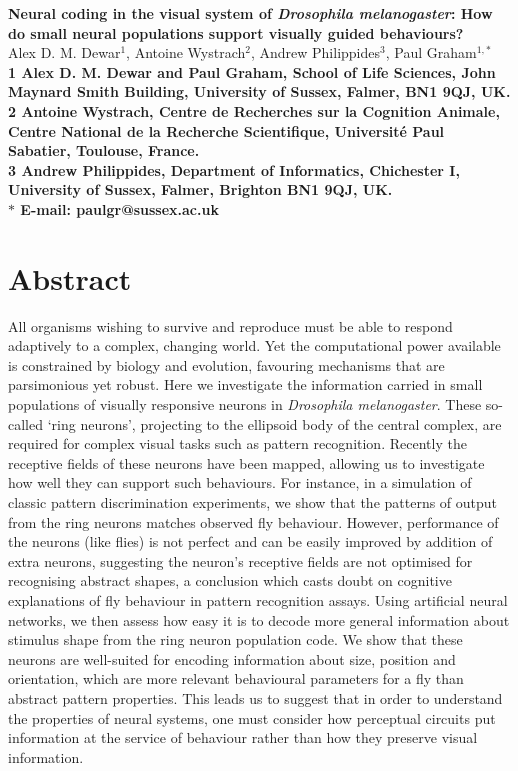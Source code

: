 \documentclass[10pt]{article}
\date{}
\begin{document}
\begin{flushleft}
{\Large
\textbf{Neural coding in the visual system of \emph{Drosophila melanogaster}: How do small neural populations support visually guided behaviours?}
}
\\
Alex D. M. Dewar$^{1}$,
Antoine Wystrach$^{2}$,
Andrew Philippides$^{3}$,
Paul Graham$^{1,\ast}$
\\
\bf{1} Alex D. M. Dewar and Paul Graham, School of Life Sciences, John Maynard Smith Building, University of Sussex, Falmer, BN1 9QJ, UK.
\\
\bf{2} Antoine Wystrach, Centre de Recherches sur la Cognition Animale, Centre National de la Recherche Scientifique, Université Paul Sabatier, Toulouse, France.
\\
\bf{3} Andrew Philippides, Department of Informatics, Chichester I, University of Sussex, Falmer, Brighton BN1 9QJ, UK.
\\
$\ast$ E-mail: paulgr@sussex.ac.uk
\end{flushleft}

\section{Abstract}
All organisms wishing to survive and reproduce must be able to respond adaptively to a complex, changing world. Yet the computational power available is constrained by biology and evolution, favouring mechanisms that are parsimonious yet robust. Here we investigate the information carried in small populations of visually responsive neurons in \emph{Drosophila melanogaster}. These so-called `ring neurons', projecting to the ellipsoid body of the central complex, are required for complex visual tasks such as pattern recognition. Recently the receptive fields of these neurons have been mapped, allowing us to investigate how well they can support such behaviours. For instance, in a simulation of classic pattern discrimination experiments, we show that the patterns of output from the ring neurons matches observed fly behaviour. However, performance of the neurons (like flies) is not perfect and can be easily improved by addition of extra neurons, suggesting the neuron's receptive fields are not optimised for recognising abstract shapes, a conclusion which casts doubt on cognitive explanations of fly behaviour in pattern recognition assays. Using artificial neural networks, we then assess how easy it is to decode more general information about stimulus shape from the ring neuron population code. We show that these neurons are well-suited for encoding information about size, position and orientation, which are more relevant behavioural parameters for a fly than abstract pattern properties. This leads us to suggest that in order to understand the properties of neural systems, one must consider how perceptual circuits put information at the service of behaviour rather than how they preserve visual information.
\end{document}
